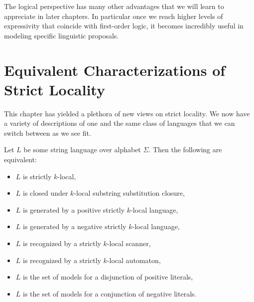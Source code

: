 The logical perspective has many other advantages that we will learn to appreciate in later chapters.
In particular once we reach higher levels of expressivity that coincide with first-order logic, it becomes incredibly useful in modeling specific linguistic proposals.


\section{Equivalent Characterizations of Strict Locality}

This chapter has yielded a plethora of new views on strict locality.
We now have a variety of descriptions of one and the same class of languages that we can switch between as we see fit.

\begin{theorem}
    Let $L$ be some string language over alphabet $\Sigma$.
    Then the following are equivalent:
    \begin{itemize}
        \item $L$ is strictly $k$-local,
        \item $L$ is closed under $k$-local substring substitution closure,
        \item $L$ is generated by a positive strictly $k$-local language,
        \item $L$ is generated by a negative strictly $k$-local language,
        \item $L$ is recognized by a strictly $k$-local scanner,
        \item $L$ is recognized by a strictly $k$-local automaton,
        \item $L$ is the set of models for a disjunction of positive literals,
        \item $L$ is the set of models for a conjunction of negative literals.
    \end{itemize}
\end{theorem}
%
